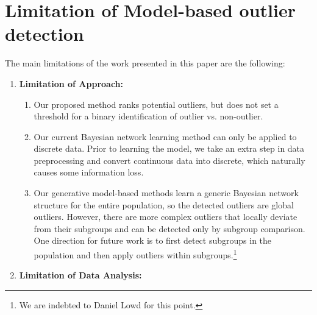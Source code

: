 {\section{Limitation of Model-based outlier detection} 

The main limitations of the work presented in this paper are the following:
\begin{enumerate}
	\item \textbf{Limitation of Approach:} 
	\begin{enumerate}\item Our proposed method ranks potential outliers, but does not set a threshold for a binary identification of outlier vs. non-outlier.
		\item Our current Bayesian network learning method can only be applied to discrete data. Prior to learning the model, we take an extra step in data preprocessing and convert continuous data into discrete, which naturally causes some information loss. \item Our generative model-based methods learn a generic Bayesian network structure for the entire population, so the detected outliers are global outliers. However, there are  more complex outliers that locally deviate from their subgroups and can be detected only by subgroup comparison. One direction for future work is to first detect subgroups in the population and then apply outliers within subgroups.\footnote{We are indebted to Daniel Lowd for this point.}
	\end{enumerate}
	\item \textbf{Limitation of Data Analysis: }
	

\end{enumerate}}
